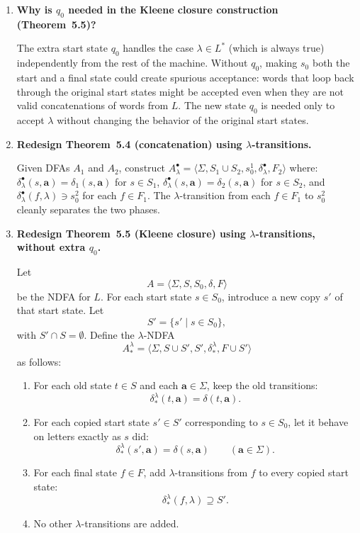 \begin{enumerate}[{5.}1. ]
\item \textbf{Why is $q_0$ needed in the Kleene closure construction (Theorem~5.5)?}

The extra start state $q_0$ handles the case $\lambda\in L^*$ (which is always
true) independently from the rest of the machine.  Without $q_0$, making $s_0$
both the start and a final state could create spurious acceptance: words that
loop back through the original start states might be accepted even when they are
not valid concatenations of words from $L$.  The new state $q_0$ is needed only
to accept $\lambda$ without changing the behavior of the original start states.

\item \textbf{Redesign Theorem~5.4 (concatenation) using $\lambda$-transitions.}

Given DFAs $A_1$ and $A_2$, construct $A^\bullet_\lambda=\langle\Sigma,S_1\cup S_2,s^1_0,\delta^\bullet_\lambda,F_2\rangle$ where:
$\delta^\bullet_\lambda(s,\pmb{a})=\delta_1(s,\pmb{a})$ for $s\in S_1$,
$\delta^\bullet_\lambda(s,\pmb{a})=\delta_2(s,\pmb{a})$ for $s\in S_2$, and
$\delta^\bullet_\lambda(f,\lambda)\ni s^2_0$ for each $f\in F_1$.
The $\lambda$-transition from each $f\in F_1$ to $s^2_0$ cleanly separates the two phases.

\item \textbf{Redesign Theorem~5.5 (Kleene closure) using $\lambda$-transitions, without extra $q_0$.}

Let
\[
A=\langle\Sigma,S,S_0,\delta,F\rangle
\]
be the NDFA for $L$.  For each start state $s\in S_0$, introduce a new copy
$s'$ of that start state.  Let
\[
S'=\{s'\mid s\in S_0\},
\]
with $S'\cap S=\emptyset$.  Define the $\lambda$-NDFA
\[
A^\lambda_*=\langle\Sigma,S\cup S',S',\delta^\lambda_*,F\cup S'\rangle
\]
as follows:
\begin{enumerate}[1.]
  \item For each old state $t\in S$ and each $\pmb{a}\in\Sigma$, keep the old
  transitions:
  \[
  \delta^\lambda_*(t,\pmb{a})=\delta(t,\pmb{a}).
  \]
  \item For each copied start state $s'\in S'$ corresponding to $s\in S_0$, let
  it behave on letters exactly as $s$ did:
  \[
  \delta^\lambda_*(s',\pmb{a})=\delta(s,\pmb{a})
  \qquad (\pmb{a}\in\Sigma).
  \]
  \item For each final state $f\in F$, add $\lambda$-transitions from $f$ to
  every copied start state:
  \[
  \delta^\lambda_*(f,\lambda)\supseteq S'.
  \]
  \item No other $\lambda$-transitions are added.
\end{enumerate}


\end{enumerate}
